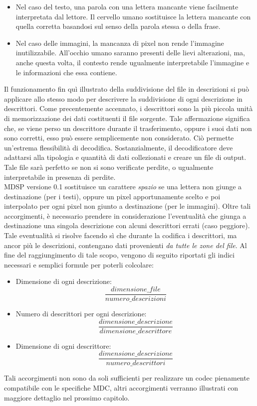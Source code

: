 \begin{itemize}
 \item Nel caso del testo, una parola con una lettera mancante viene facilmente interpretata dal lettore. Il cervello umano sostituisce la lettera mancante con quella corretta basandosi sul senso della parola stessa o della frase.
 \item Nel caso delle immagini, la mancanza di pixel non rende l'immagine inutilizzabile. All'occhio umano saranno presenti delle lievi alterazioni, ma, anche questa volta, il contesto rende ugualmente interpretabile l'immagine e le informazioni che essa contiene.
\end{itemize}
Il funzionamento fin qu\`i illustrato della suddivisione del file in descrizioni si pu\`o applicare allo stesso modo per descrivere la suddivisione di ogni descrizione in descrittori. Come precentemente accennato, i descrittori sono la pi\`u piccola unit\`a di memorizzazione dei dati costituenti il file sorgente. Tale affermazione significa che, se viene perso un descrittore durante il trasferimento, oppure i suoi dati non sono corretti, esso può essere semplicemente non considerato. Ci\`o permette un'estrema flessibilit\`a di decodifica. Sostanzialmente, il decodificatore deve adattarsi alla tipologia e quantit\`a di dati collezionati e creare un file di output. Tale file sar\`a perfetto se non si sono verificate perdite, o ugualmente interpretabile in presenza di perdite.
\\
MDSP versione 0.1 sostituisce un carattere \emph{spazio} se una lettera non giunge a destinazione (per i testi), oppure un pixel apportunamente scelto e poi interpolato per ogni pixel non giunto a destinazione (per le immagini). Oltre tali accorgimenti, è necessario prendere in considerazione l'eventualità che giunga a destinazione una singola descrizione con alcuni descrittori errati (caso peggiore). Tale eventualit\`a si risolve facendo s\`i che durante la codifica i descrittori, ma ancor pi\`u le descrizioni, contengano dati provenienti \emph{da tutte le zone del file}. Al fine del raggiungimento di tale scopo, vengono di seguito riportati gli indici necessari e semplici formule per poterli colcolare:
\begin{itemize}
 \item Dimensione di ogni descrizione: $$\frac{dimensione\_file}{numero\_descrizioni}$$
 \item Numero di descrittori per ogni descrizione: $$\frac{dimensione\_descrizione}{dimensione\_descrittore}$$
 \item Dimensione di ogni descrittore: $$\frac{dimensione\_descrizione}{numero\_descrittori}$$
\end{itemize}
Tali accorgimenti non sono da soli sufficienti per realizzare un codec pienamente compatibile con le specifiche MDC, altri accorgimenti verranno illustrati con maggiore dettaglio nel prossimo capitolo.